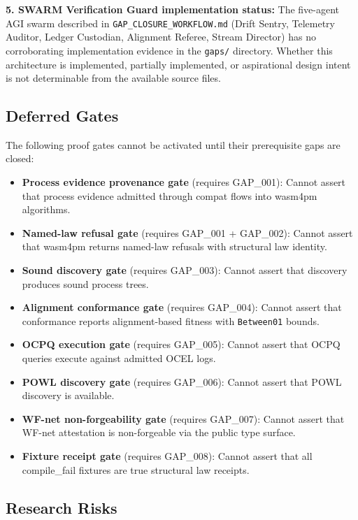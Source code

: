 \textbf{5. SWARM Verification Guard implementation status:} The five-agent AGI swarm
described in \texttt{GAP\_CLOSURE\_WORKFLOW.md} (Drift Sentry, Telemetry Auditor,
Ledger Custodian, Alignment Referee, Stream Director) has no corroborating implementation
evidence in the \texttt{gaps/} directory. Whether this architecture is implemented,
partially implemented, or aspirational design intent is not determinable from the
available source files.

\subsection{Deferred Gates}
\label{sec:gaps-open-questions-deferred}

The following proof gates cannot be activated until their prerequisite gaps are closed:

\begin{itemize}
  \item \textbf{Process evidence provenance gate} (requires GAP\_001): Cannot assert
        that process evidence admitted through compat flows into wasm4pm algorithms.
  \item \textbf{Named-law refusal gate} (requires GAP\_001 + GAP\_002): Cannot assert
        that wasm4pm returns named-law refusals with structural law identity.
  \item \textbf{Sound discovery gate} (requires GAP\_003): Cannot assert that discovery
        produces sound process trees.
  \item \textbf{Alignment conformance gate} (requires GAP\_004): Cannot assert that
        conformance reports alignment-based fitness with \texttt{Between01} bounds.
  \item \textbf{OCPQ execution gate} (requires GAP\_005): Cannot assert that OCPQ
        queries execute against admitted OCEL logs.
  \item \textbf{POWL discovery gate} (requires GAP\_006): Cannot assert that POWL
        discovery is available.
  \item \textbf{WF-net non-forgeability gate} (requires GAP\_007): Cannot assert that
        WF-net attestation is non-forgeable via the public type surface.
  \item \textbf{Fixture receipt gate} (requires GAP\_008): Cannot assert that all
        compile\_fail fixtures are true structural law receipts.
\end{itemize}

\subsection{Research Risks}
\label{sec:gaps-open-questions-risks}

